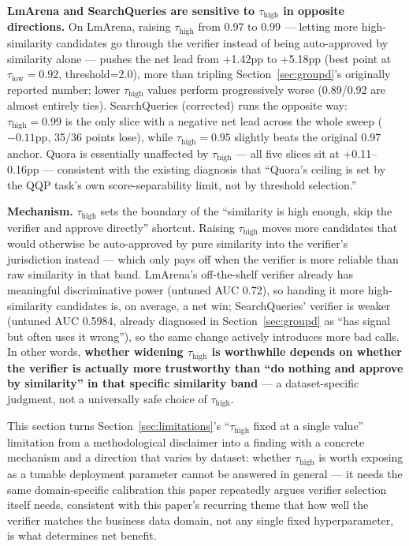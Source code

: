 \documentclass[11pt]{article}
\newcommand{\taulow}{\ensuremath{\tau_{\text{low}}}}
\newcommand{\tauhigh}{\ensuremath{\tau_{\text{high}}}}
\begin{document}
\textbf{LmArena and SearchQueries are sensitive to $\tauhigh$ in opposite directions.} On LmArena, raising $\tauhigh$ from 0.97 to 0.99 --- letting more high-similarity candidates go through the verifier instead of being auto-approved by similarity alone --- pushes the net lead from +1.42pp to +5.18pp (best point at $\taulow=0.92$, threshold=2.0), more than tripling Section~\ref{sec:groupd}'s originally reported number; lower $\tauhigh$ values perform progressively worse (0.89/0.92 are almost entirely ties). SearchQueries (corrected) runs the opposite way: $\tauhigh=0.99$ is the only slice with a negative net lead across the whole sweep ($-0.11$pp, 35/36 points lose), while $\tauhigh=0.95$ slightly beats the original 0.97 anchor. Quora is essentially unaffected by $\tauhigh$ --- all five slices sit at +0.11--0.16pp --- consistent with the existing diagnosis that ``Quora's ceiling is set by the QQP task's own score-separability limit, not by threshold selection.''

\textbf{Mechanism.} $\tauhigh$ sets the boundary of the ``similarity is high enough, skip the verifier and approve directly'' shortcut. Raising $\tauhigh$ moves more candidates that would otherwise be auto-approved by pure similarity into the verifier's jurisdiction instead --- which only pays off when the verifier is more reliable than raw similarity in that band. LmArena's off-the-shelf verifier already has meaningful discriminative power (untuned AUC 0.72), so handing it more high-similarity candidates is, on average, a net win; SearchQueries' verifier is weaker (untuned AUC 0.5984, already diagnosed in Section~\ref{sec:groupd} as ``has signal but often uses it wrong''), so the same change actively introduces more bad calls. In other words, \textbf{whether widening $\tauhigh$ is worthwhile depends on whether the verifier is actually more trustworthy than ``do nothing and approve by similarity'' in that specific similarity band} --- a dataset-specific judgment, not a universally safe choice of $\tauhigh$.

This section turns Section~\ref{sec:limitations}'s ``$\tauhigh$ fixed at a single value'' limitation from a methodological disclaimer into a finding with a concrete mechanism and a direction that varies by dataset: whether $\tauhigh$ is worth exposing as a tunable deployment parameter cannot be answered in general --- it needs the same domain-specific calibration this paper repeatedly argues verifier selection itself needs, consistent with this paper's recurring theme that how well the verifier matches the business data domain, not any single fixed hyperparameter, is what determines net benefit.
\end{document}
